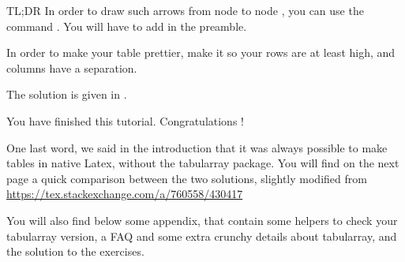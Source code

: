 \begin{infobox}{TL;DR}
In order to draw such arrows from node  to node , you can use the command . You will have to add  in the preamble.

In order to make your table prettier, make it so your rows are at least \snippet{12pt} high, and columns have a \snippet{4pt} separation.

The solution is given in .
\end{infobox}


You have finished this tutorial. Congratulations ! 

One last word, we said in the introduction that it was always possible to make tables in native Latex, without the tabularray package. You will find on the next page a quick comparison between the two solutions, slightly modified from \url{https://tex.stackexchange.com/a/760558/430417}

You will also find below some appendix, that contain some helpers to check your tabularray version, a FAQ and some extra crunchy details about tabularray, and the solution to the exercises.

